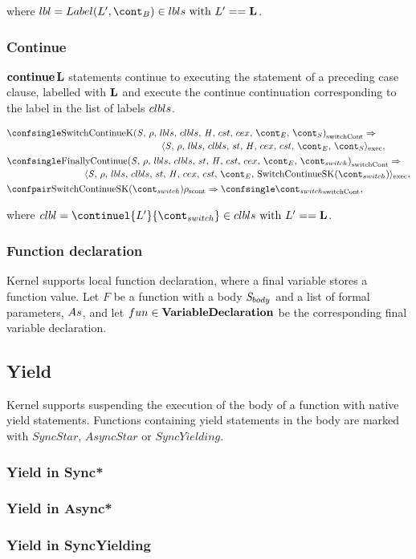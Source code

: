 \documentclass[a4paper,oneside]{article}
\newcommand{\synt}[1]{\ensuremath{\text{\textbf{#1}}}}
\DeclareMathOperator{\continue}{\synt{continue}}
\newcommand{\cesktrans}[2]{\ensuremath{{#1} \Rightarrow {#2}}}
\newcommand{\cesktranssplit}[2]{\ensuremath{{#1} \Rightarrow\\ {#2}}}
\begin{document}
\noindent where $\lbl = Label(L', \bcont) \in \lbls \text{ with } L' == \mathbf{L}$.


\subsubsection{Continue}

$\continue \synt{L}$ statements continue to executing the statement of a preceding case clause, labelled with $\synt{L}$ and execute the continue continuation corresponding to the label in the list of labels $clbls$.

\begin{align*}
    &\begin{multlined}
        \cesktranssplit%
            {\switchconf{\ContinueK}}%
            {\execconf{\stmt}{\env}{\lbls}{\clbls}{\strace}{\handler}{\cex,\,\cstrace}{\econt}{\scont}},
    \end{multlined}\\
    &\begin{multlined}
        \cesktranssplit%
            {\switchconf{\FinallyContinue{\stmt}{\switchcont}}}%
            {\execconf{\stmt}{\env}{\lbls}{\clbls}{\strace}{\handler}{\cex,\,\cstrace}{\econt}{\mathrm{SwitchContinueSK}(\switchcont)}},
    \end{multlined}\\
    &\cesktrans%
        {\scontconf{\mathrm{SwitchContinueSK}(\switchcont)}{\env}}%
        {\switchconf{\switchcont}},
\end{align*}

\noindent where $\clbl = \continuel{L'}{\switchcont} \in \clbls \text{ with } L' == \mathbf{L}$.


\subsubsection{Function declaration}

Kernel supports local function declaration, where a final variable stores a function value.
Let $F$ be a function with a body $\mathit{S}_{body}$ and a list of formal parameters, $As$, and let $fun \in \mathbf{VariableDeclaration}$ be the corresponding final variable declaration.


\subsection{Yield}

Kernel supports suspending the execution of the body of a function with native yield statements.
Functions containing yield statements in the body are marked with $SyncStar$, $AsyncStar$ or $SyncYielding$.
\subsubsection{Yield in Sync*}
\label{subsubsec:yeld-in-syncstar}
\subsubsection{Yield in Async*}
\label{subsubsec:yield-in-asyncstar}
\subsubsection{Yield in SyncYielding}
\label{subsubsec:yield-in-syncyelding}
\end{document}
